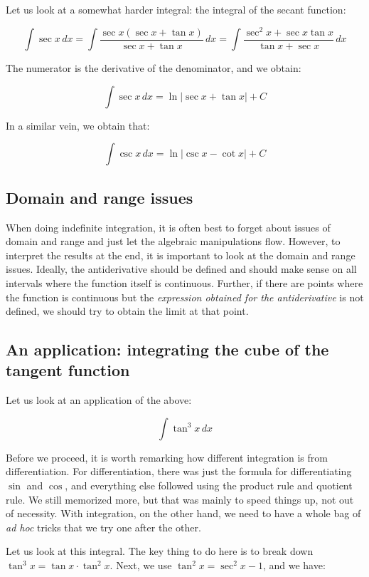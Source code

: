 \documentclass[10pt]{amsart}
\begin{document}
Let us look at a somewhat harder integral: the integral of the secant
function:

$$\int \sec x \, dx = \int \frac{\sec x (\sec x + \tan x)}{\sec x + \tan x} \, dx = \int \frac{\sec^2 x + \sec x \tan x}{\tan x + \sec x} \, dx$$

The numerator is the derivative of the denominator, and we obtain:

$$\int \sec x \, dx = \ln|\sec x + \tan x| + C$$

In a similar vein, we obtain that:

$$\int \csc x \, dx = \ln|\csc x - \cot x| + C$$

\subsection{Domain and range issues}

When doing indefinite integration, it is often best to forget about
issues of domain and range and just let the algebraic manipulations
flow. However, to interpret the results at the end, it is important to
look at the domain and range issues. Ideally, the antiderivative
should be defined and should make sense on all intervals where the
function itself is continuous. Further, if there are points where the
function is continuous but the {\em expression obtained for the
antiderivative} is not defined, we should try to obtain the limit at
that point.

\subsection{An application: integrating the cube of the tangent function}

Let us look at an application of the above:

$$\int \tan^3 x \, dx$$

Before we proceed, it is worth remarking how different integration is
from differentiation. For differentiation, there was just the formula
for differentiating $\sin$ and $\cos$, and everything else followed
using the product rule and quotient rule. We still memorized more, but
that was mainly to speed things up, not out of necessity. With
integration, on the other hand, we need to have a whole bag of {\em ad
hoc} tricks that we try one after the other.

Let us look at this integral. The key thing to do here is to break
down $\tan^3 x = \tan x \cdot \tan^2 x$. Next, we use $\tan^2 x =
\sec^2 x - 1$, and we have:
\end{document}
